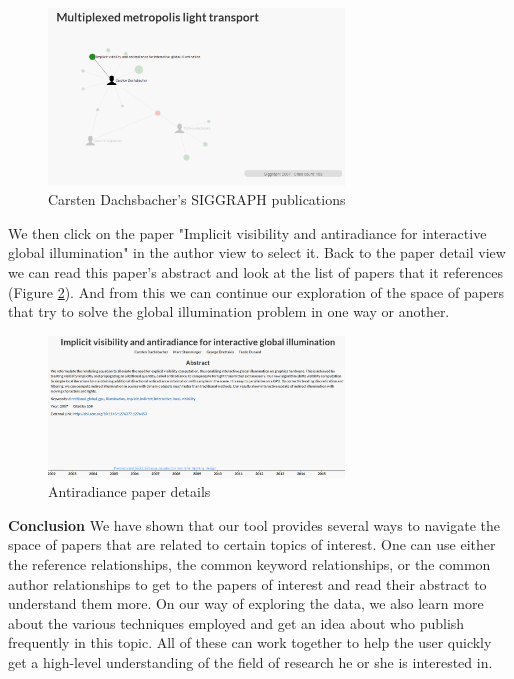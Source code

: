 \begin{figure}[ht]			
    \centering
    \includegraphics[width=0.7\textwidth]{carsten_dachsbacher.png}
    \caption{Carsten Dachsbacher's SIGGRAPH publications}
    \label{fig:carsten_dachsbacher}
\end{figure}

We then click on the paper "Implicit visibility and antiradiance for interactive global illumination" in the author view to select it. Back to the paper detail view we can read this paper's abstract and look at the list of papers that it references (Figure \ref{fig:antiradiance}). And from this we can continue our exploration of the space of papers that try to solve the global illumination problem in one way or another.

\begin{figure}[ht]			
    \centering
    \includegraphics[width=0.7\textwidth]{antiradiance_paper_detail.png}
    \caption{Antiradiance paper details}
    \label{fig:antiradiance}
\end{figure}

\textbf{Conclusion}
We have shown that our tool provides several ways to navigate the space of papers that are related to certain topics of interest. One can use either the reference relationships, the common keyword relationships, or the common author relationships to get to the papers of interest and read their abstract to understand them more. On our way of exploring the data, we also  learn more about the various techniques employed and get an idea about who publish frequently in this topic. All of these can work together to help the user quickly get a high-level understanding of the field of research he or she is interested in.
